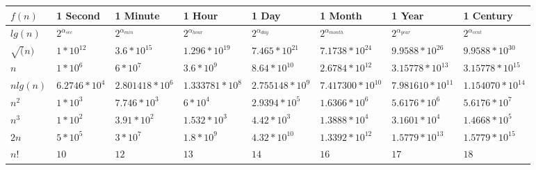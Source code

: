 \documentclass{article}
\begin{document}
\begin{longtable}[H]{|p{1.5cm}|p{1.5cm}|p{1.5cm}|p{1.5cm}|p{1.5cm}|p{1.5cm}|p{1.5cm}|p{1.5cm}|}
\hline
$f(n)$ & \textbf{1 Second} & \textbf{1 Minute} & \textbf{1 Hour} & \textbf{1 Day} & \textbf{1 Month} & \textbf{1 Year} & \textbf{1 Century} \\ \hline

 $lg(n)$ & $2^{\alpha_{sec}}$ & $2^{\alpha_{min}}$ & $2^{\alpha_{hour}}$ & $2^{\alpha_{day}}$ & $2^{\alpha_{month}}$ & $2^{\alpha_{year}}$ & $2^{\alpha_{cent}}$ \\ \hline
 
 $\sqrt(n)$ & $1*10^{12}$ & $3.6*10^{15}$ & $1.296*10^{19}$ & $7.465*10^{21}$ & $7.1738*10^{24}$ & $9.9588*10^{26}$ & $9.9588*10^{30}$ \\ \hline
 
 $n$ & $1*10^6$ & $6*10^7$ & $3.6*10^9$ & $8.64*10^{10}$ & $2.6784*10^{12}$ & $3.15778*10^{13}$ & $3.15778*10^{15}$ \\ \hline
 
 $n lg(n)$ & $6.2746*10^{4}$ & $2.801418*10^{6}$ & $1.333781*10^{8}$ & $2.755148*10^{9}$ & $7.417300*10^{10}$ & $7.981610*10^{11}$ & $1.154070*10^{14}$ \\ \hline
 
 $n^2$ & $1*10^{3}$ & $7.746*10^{3}$ & $6*10^{4}$ & $2.9394*10^{5}$ & $1.6366*10^{6}$ & $5.6176*10^{6}$ & $5.6176*10^{7}$ \\ \hline
 
 $n^3$ & $1*10^2{}$ & $3.91*10^{2}$ & $1.532*10^{3}$ & $4.42*10^{3}$ & $1.3888*10^{4}$ & $3.1601*10^{4}$ & $1.4668*10^{5}$ \\ \hline
 
 $2n$ & $5*10^5$ & $3*10^7$ & $1.8*10^9$ & $4.32*10^{10}$ & $1.3392*10^{12}$ & $1.5779*10^{13}$ & $1.5779*10^{15}$ \\ \hline
 
 $n!$ & $10$ & $12$ & $13$ & $14$ & $16$ & $17$ & $18$ \\ \hline
\end{longtable}
\end{document}
